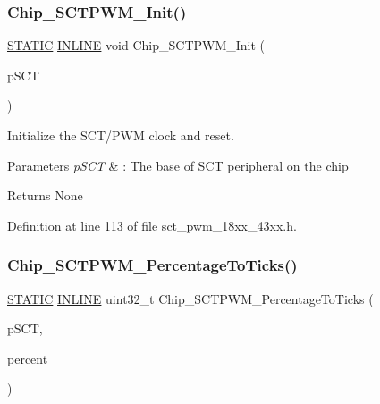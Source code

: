 \subsubsection{\texorpdfstring{Chip\+\_\+\+S\+C\+T\+P\+W\+M\+\_\+\+Init()}{Chip\_SCTPWM\_Init()}}
{\footnotesize\ttfamily \hyperlink{group___l_p_c___types___public___macros_ga10b2d890d871e1489bb02b7e70d9bdfb}{S\+T\+A\+T\+IC} \hyperlink{spifi__18xx__43xx_8h_a2eb6f9e0395b47b8d5e3eeae4fe0c116}{I\+N\+L\+I\+NE} void Chip\+\_\+\+S\+C\+T\+P\+W\+M\+\_\+\+Init (\begin{DoxyParamCaption}\item[{\hyperlink{struct_l_p_c___s_c_t___t}{L\+P\+C\+\_\+\+S\+C\+T\+\_\+T} $\ast$}]{p\+S\+CT }\end{DoxyParamCaption})}



Initialize the S\+C\+T/\+P\+WM clock and reset. 


\begin{DoxyParams}{Parameters}
{\em p\+S\+CT} & \+: The base of S\+CT peripheral on the chip \\
\hline
\end{DoxyParams}
\begin{DoxyReturn}{Returns}
None 
\end{DoxyReturn}


Definition at line 113 of file sct\+\_\+pwm\+\_\+18xx\+\_\+43xx.\+h.

\mbox{\label{group___s_c_t___p_w_m__18_x_x__43_x_x_gac04da455f98448bf1d582550935f3b47}} 
\subsubsection{\texorpdfstring{Chip\+\_\+\+S\+C\+T\+P\+W\+M\+\_\+\+Percentage\+To\+Ticks()}{Chip\_SCTPWM\_PercentageToTicks()}}
{\footnotesize\ttfamily \hyperlink{group___l_p_c___types___public___macros_ga10b2d890d871e1489bb02b7e70d9bdfb}{S\+T\+A\+T\+IC} \hyperlink{spifi__18xx__43xx_8h_a2eb6f9e0395b47b8d5e3eeae4fe0c116}{I\+N\+L\+I\+NE} uint32\+\_\+t Chip\+\_\+\+S\+C\+T\+P\+W\+M\+\_\+\+Percentage\+To\+Ticks (\begin{DoxyParamCaption}\item[{\hyperlink{struct_l_p_c___s_c_t___t}{L\+P\+C\+\_\+\+S\+C\+T\+\_\+T} $\ast$}]{p\+S\+CT,  }\item[{uint8\+\_\+t}]{percent }\end{DoxyParamCaption})}



